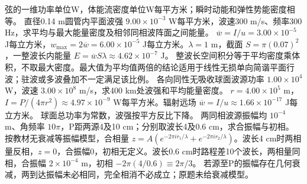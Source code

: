 \crosscheck 弦的一维功率单位W，体能流密度单位W每平方米；瞬时动能和弹性势能密度相等。
\problemtext 直径0.14 m圆管内平面波强 $9.00\times10^{-3}$ W每平方米，波速300 m/s、频率300 Hz，求平均与最大能量密度及相邻同相波阵面之间能量。
\workings $\overline w=I/u=3.00\times10^{-5}$ J每立方米，$w_{\max}=2\overline w=6.00\times10^{-5}$ J每立方米。$\lambda=1$ m，截面 $S=\pi(0.07)^2$，一整波长内能量 $E=\overline w S\lambda\approx4.62\times10^{-7}$ J。
\crosscheck 整波长空间积分等于平均密度乘体积，不取最大密度。最大值为平均值两倍的结论适用于线性无损单向简谐平面行波；驻波或多波叠加不一定满足该比例。
\problemtext 各向同性无吸收球面波源功率 $1.00\times10^4$ W，波速 $3.00\times10^8$ m/s，求400 km处波强和平均能量密度。
\workings $r=4.00\times10^5$ m，$I=P/(4\pi r^2)\approx4.97\times10^{-9}$ W每平方米。辐射远场 $\overline w=I/u\approx1.66\times10^{-17}$ J每立方米。
\crosscheck 球面总功率为常数，波强按平方反比下降。
\problemtext 两同相波源振幅均 $10^{-4}$ m、角频率 $10\pi$，P距两源4及10 cm；分别取波长4及0.6 cm，求合振幅与初相。
\workings 按教材无衰减等振幅模型，合相量 $z=A(e^{-2\pi i r_1/\lambda}+e^{-2\pi i r_2/\lambda})$。波长4 cm时两相量反相，$z=0$，合振幅0，初相无定义。波长0.6 cm时路程差10个波长，两相量同相，合振幅 $2\times10^{-4}$ m，初相 $-2\pi(4/0.6)\equiv2\pi/3$。
\crosscheck 若源至P的振幅存在几何衰减，两到达振幅未必相同，完全相消不必成立；原题未给衰减模型。

